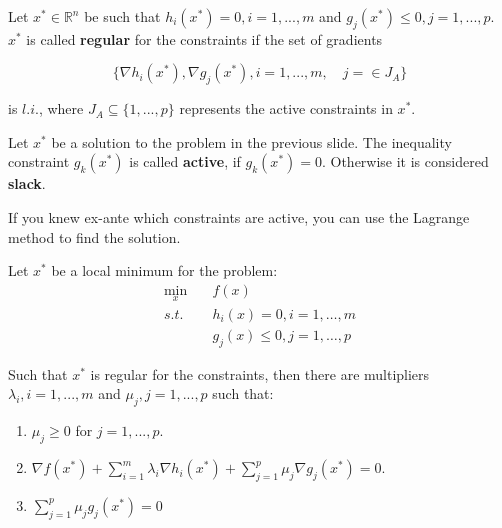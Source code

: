 \documentclass[aspectratio=169]{beamer}
\begin{document}
\begin{frame}
    \begin{definition}
    
        Let $x^*\in\mathds{R}^n$ be such that $h_i(x^*)=0, i=1,...,m$ and $g_j(x^*)\leq 0,j=1,...,p$. $x^*$ is called \textbf{regular} for the constraints if the set of gradients
        
        $$\{\nabla h_i(x^*),\nabla g_j(x^*), i=1,...,m,\quad j=\in J_A\}$$
        
        is $l.i.$, where $J_A\subseteq\{1,...,p\}$ represents the active constraints in $x^*$.
    
    \end{definition}
\end{frame}


\begin{frame}
    \begin{definition}
        Let $x^*$ be a solution to the problem in the previous slide. The inequality constraint $g_k(x^*)$ is called \textbf{active}, if $g_k(x^*)=0$. Otherwise it is considered \textbf{slack}.
    \end{definition}
    
    \vspace{0.5cm}
    
    If you knew ex-ante which constraints are active, you can use the Lagrange method to find the solution.
\end{frame}

\begin{frame}
    \begin{theorem}
        Let $x^*$ be a local minimum for the problem:
        \begin{align*}
            \min_x \quad &f(x)\\
            s.t.\quad & h_i(x)=0,i=1,\ldots,m\\
            &g_j(x)\leq 0, j=1,\ldots,p
        \end{align*}
        
        Such that $x^*$ is regular for the constraints, then there are multipliers $\lambda_i,i=1,...,m$ and $\mu_j,j=1,...,p$ such that:
        
        \begin{enumerate}
            \item $\mu_j\geq 0$ for $j=1,...,p$.
            \item $\nabla f(x^*)+\sum_{i=1}^m\lambda_i\nabla h_i(x^*)+\sum_{j=1}^p\mu_j\nabla g_j(x^*)=0$.
            \item $\sum_{j=1}^p \mu_j g_j(x^*)=0$
        \end{enumerate}
    \end{theorem}
\end{frame}
\end{document}

